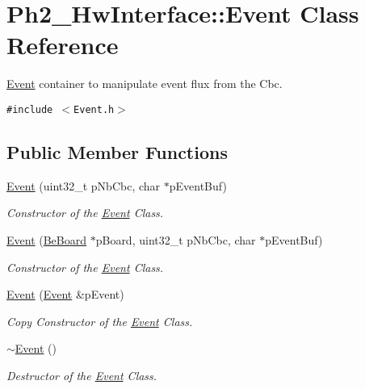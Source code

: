 \hypertarget{class_ph2___hw_interface_1_1_event}{
\section{Ph2\_\-Hw\-Interface::Event Class Reference}
\label{class_ph2___hw_interface_1_1_event}
}
\hyperlink{class_ph2___hw_interface_1_1_event}{Event} container to manipulate event flux from the Cbc.  


{\tt \#include $<$Event.h$>$}

\subsection*{Public Member Functions}
\begin{CompactItemize}
\item 
\hyperlink{class_ph2___hw_interface_1_1_event_683bd51c34b6b849a970f50b4c2a61c3}{Event} (uint32\_\-t p\-Nb\-Cbc, char $\ast$p\-Event\-Buf)
\begin{CompactList}\small\item\em Constructor of the \hyperlink{class_ph2___hw_interface_1_1_event}{Event} Class. \item\end{CompactList}\item 
\hyperlink{class_ph2___hw_interface_1_1_event_39280981aa5ea8a3a6d9adce5e1fe409}{Event} (\hyperlink{class_ph2___hw_description_1_1_be_board}{Be\-Board} $\ast$p\-Board, uint32\_\-t p\-Nb\-Cbc, char $\ast$p\-Event\-Buf)
\begin{CompactList}\small\item\em Constructor of the \hyperlink{class_ph2___hw_interface_1_1_event}{Event} Class. \item\end{CompactList}\item 
\hyperlink{class_ph2___hw_interface_1_1_event_3f676bea23859e6417f1ccbade7308df}{Event} (\hyperlink{class_ph2___hw_interface_1_1_event}{Event} \&p\-Event)
\begin{CompactList}\small\item\em Copy Constructor of the \hyperlink{class_ph2___hw_interface_1_1_event}{Event} Class. \item\end{CompactList}\item 
\hyperlink{class_ph2___hw_interface_1_1_event_2698d395adfcd65d0853676a899127fc}{$\sim$Event} ()
\begin{CompactList}\small\item\em Destructor of the \hyperlink{class_ph2___hw_interface_1_1_event}{Event} Class. \item\end{CompactList}\item 

\end{CompactItemize}
